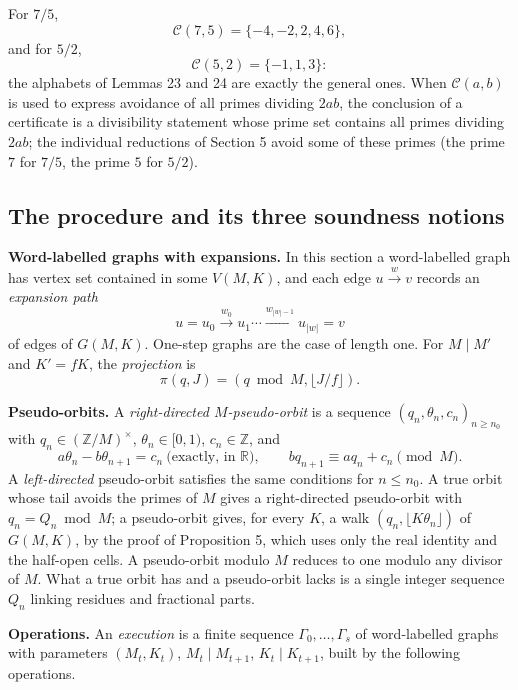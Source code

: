 \documentclass[11pt,reqno]{amsart}
\theoremstyle{definition}
\theoremstyle{remark}
\begin{document}
For \(7/5\),
\[
\mathcal C(7,5)=\{-4,-2,2,4,6\},
\]
and for \(5/2\),
\[
\mathcal C(5,2)=\{-1,1,3\}:
\]
the alphabets of Lemmas 23 and 24 are
exactly the general ones. When \(\mathcal C(a,b)\) is used to express
avoidance of all primes dividing \(2ab\), the conclusion of a certificate
is a divisibility statement whose prime set contains all primes dividing
\(2ab\); the individual reductions of Section 5 avoid some of these
primes (the prime \(7\) for \(7/5\), the prime \(5\) for \(5/2\)).

\subsection{The procedure and its three soundness notions}\label{sec:7.2}

\textbf{Word-labelled graphs with expansions.} In this section a word-labelled
graph has vertex set contained in some \(V(M,K)\), and each edge
\(u\xrightarrow{w}v\) records an \emph{expansion path}
\[
u=u_0\xrightarrow{w_0}u_1\cdots\xrightarrow{w_{|w|-1}}u_{|w|}=v
\]
of
edges of \(G(M,K)\). One-step graphs are the case of length one.
For \(M\mid M'\) and \(K'=fK\), the \emph{projection} is
\[
\pi(q,J)=(q\bmod M,\lfloor J/f\rfloor).
\]

\textbf{Pseudo-orbits.} A \emph{right-directed \(M\)-pseudo-orbit} is a sequence
\((q_n,\theta_n,c_n)_{n\ge n_0}\) with \(q_n\in(\mathbb Z/M)^\times\),
\(\theta_n\in[0,1)\), \(c_n\in\mathbb Z\), and
\[
a\theta_n-b\theta_{n+1}=c_n\ \text{(exactly, in }\mathbb R),\qquad
bq_{n+1}\equiv aq_n+c_n\pmod M .
\]
A \emph{left-directed} pseudo-orbit satisfies the same conditions for
\(n\le n_0\). A true orbit whose tail avoids the primes of \(M\) gives a
right-directed pseudo-orbit with \(q_n=Q_n\bmod M\); a pseudo-orbit gives,
for every \(K\), a walk \((q_n,\lfloor K\theta_n\rfloor)\) of
\(G(M,K)\), by the proof of Proposition 5, which uses only the real
identity and the half-open cells. A pseudo-orbit modulo \(M\) reduces to
one modulo any divisor of \(M\). What a true orbit has and a pseudo-orbit
lacks is a single integer sequence \(Q_n\) linking residues and fractional
parts.

\textbf{Operations.} An \emph{execution} is a finite sequence
\(\Gamma_0,\ldots,\Gamma_s\) of word-labelled graphs with parameters
\((M_t,K_t)\), \(M_t\mid M_{t+1}\), \(K_t\mid K_{t+1}\), built by the
following operations.
\end{document}
